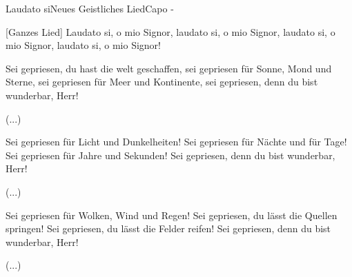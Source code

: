 \begin{song}{Laudato si}{Neues Geistliches Lied}{Capo -}

 [Ganzes Lied]
Laudato si, o mio Signor, laudato si, o mio Signor,
laudato si, o mio Signor, laudato si, o mio Signor!

Sei gepriesen, du hast die welt geschaffen,
sei gepriesen für Sonne, Mond und Sterne,
sei gepriesen für Meer und Kontinente,
sei gepriesen, denn du bist wunderbar, Herr!

 (...)

Sei gepriesen für Licht und Dunkelheiten!
Sei gepriesen für Nächte und für Tage!
Sei gepriesen für Jahre und Sekunden!
Sei gepriesen, denn du bist wunderbar, Herr!

 (...)

Sei gepriesen für Wolken, Wind und Regen!
Sei gepriesen, du lässt die Quellen springen!
Sei gepriesen, du lässt die Felder reifen!
Sei gepriesen, denn du bist wunderbar, Herr!

 (...)

\end{song}